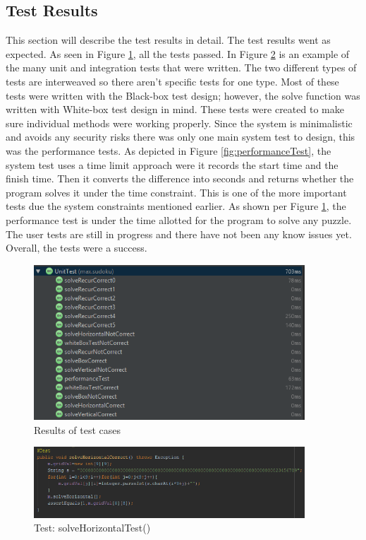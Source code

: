 \documentclass{article}
\begin{document}
\subsection{Test Results}
This section will describe the test results in detail. The test results went as expected. As seen in Figure \ref{fig:tests}, all the tests passed. In Figure \ref{fig:horizontalTest} is an example of the many unit and integration tests that were written. The two different types of tests are interweaved so there aren't specific tests for one type. Most of these tests were written with the Black-box test design; however, the solve function was written with White-box test design in mind. These tests were created to make sure individual methods were working properly. Since the system is minimalistic and avoids any security risks there was only one main system test to design, this was the performance tests. As depicted in Figure \ref{fig:performanceTest}, the system test uses a time limit approach were it records the start time and the finish time. Then it converts the difference into seconds and returns whether the program solves it under the time constraint. This is one of the more important tests due the system constraints mentioned earlier. As shown per Figure \ref{fig:tests}, the performance test is under the time allotted for the program to solve any puzzle. The user tests are still in progress and there have not been any know issues yet. Overall, the tests were a success.
\begin{figure}[ht]\centering
\includegraphics[width=4.0in]{./Figure/unit_test_results.PNG}
\caption{Results of test cases}\label{fig:tests}
\end{figure}
\begin{figure}[ht]\centering
\includegraphics[width=4.0in]{./Figure/solve_horizontal_test.PNG}
\caption{Test: solveHorizontalTest()}\label{fig:horizontalTest}
\end{figure}
\end{document}
